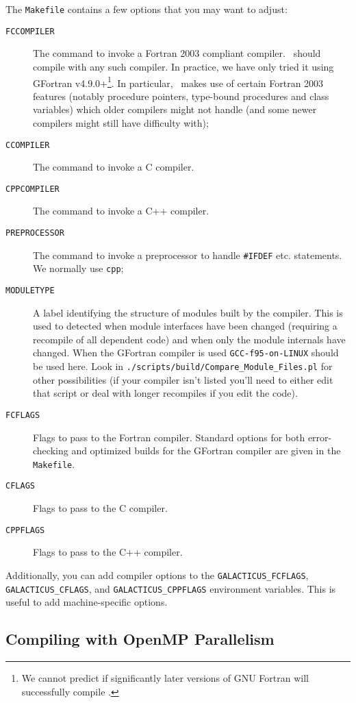 The {\tt Makefile} contains a few options that you may want to adjust:
\begin{description}
 \item[{\tt FCCOMPILER}] The command to invoke a Fortran 2003 compliant compiler. \glc\ should compile with any such compiler. In practice, we have only tried it using {\sc GFortran} v4.9.0+\footnote{We cannot predict if significantly later versions of GNU Fortran will successfully compile \protect\glc.}. In particular, \glc\ makes use of certain Fortran 2003 features (notably procedure pointers, type-bound procedures and class variables) which older compilers might not handle (and some newer compilers might still have difficulty with);
 \item[{\tt CCOMPILER}] The command to invoke a C compiler.
 \item[{\tt CPPCOMPILER}] The command to invoke a C++ compiler.
 \item[{\tt PREPROCESSOR}] The command to invoke a preprocessor to handle {\tt \#IFDEF} etc. statements. We normally use {\tt cpp};
 \item[{\tt MODULETYPE}] A label identifying the structure of modules built by the compiler. This is used to detected when module interfaces have been changed (requiring a recompile of all dependent code) and when only the module internals have changed. When the {\sc GFortran} compiler is used {\tt GCC-f95-on-LINUX} should be used here. Look in {\tt ./scripts/build/Compare\_Module\_Files.pl} for other possibilities (if your compiler isn't listed you'll need to either edit that script or deal with longer recompiles if you edit the code).
 \item[{\tt FCFLAGS}] Flags to pass to the Fortran compiler. Standard options for both error-checking and optimized builds for the {\sc GFortran} compiler are given in the {\tt Makefile}.
 \item[{\tt CFLAGS}] Flags to pass to the C compiler.
 \item[{\tt CPPFLAGS}] Flags to pass to the C++ compiler.
\end{description}
Additionally, you can add compiler options to the {\tt GALACTICUS\_FCFLAGS}, {\tt GALACTICUS\_CFLAGS}, and {\tt GALACTICUS\_CPPFLAGS} environment variables. This is useful to add machine-specific options.

\subsection{Compiling with OpenMP Parallelism}

